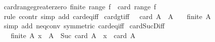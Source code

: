 \begin{isabellebody}
\isadelimproof
\isanewline
%
\endisadelimproof
\isanewline
{}\isamarkupfalse%
\ card{\isacharunderscore}{\kern0pt}range{\isacharunderscore}{\kern0pt}greater{\isacharunderscore}{\kern0pt}zero{\isacharcolon}{\kern0pt}\ {\isachardoublequoteopen}finite\ {\isacharparenleft}{\kern0pt}range\ f{\isacharparenright}{\kern0pt}\ {\isasymLongrightarrow}\ card\ {\isacharparenleft}{\kern0pt}range\ f{\isacharparenright}{\kern0pt}\ {\isachargreater}{\kern0pt}\ {}{\isachardoublequoteclose}\isanewline
%
\isadelimproof
\ \ %
\endisadelimproof
%
\isatagproof
{}\isamarkupfalse%
\ {\isacharparenleft}{\kern0pt}rule\ ccontr{\isacharparenright}{\kern0pt}\ {\isacharparenleft}{\kern0pt}simp\ add{\isacharcolon}{\kern0pt}\ card{\isacharunderscore}{\kern0pt}eq{\isacharunderscore}{\kern0pt}{}{\isacharunderscore}{\kern0pt}iff{\isacharparenright}{\kern0pt}%
\endisatagproof
{\isafoldproof}%
%
\isadelimproof
\isanewline
%
\endisadelimproof
\isanewline
{}\isamarkupfalse%
\ card{\isacharunderscore}{\kern0pt}gt{\isacharunderscore}{\kern0pt}{}{\isacharunderscore}{\kern0pt}iff{\isacharcolon}{\kern0pt}\ {\isachardoublequoteopen}{}\ {\isacharless}{\kern0pt}\ card\ A\ {\isasymlongleftrightarrow}\ A\ {\isasymnoteq}\ {\isacharbraceleft}{\kern0pt}{\isacharbraceright}{\kern0pt}\ {\isasymand}\ finite\ A{\isachardoublequoteclose}\isanewline
%
\isadelimproof
\ \ %
\endisadelimproof
%
\isatagproof
{}\isamarkupfalse%
\ {\isacharparenleft}{\kern0pt}simp\ add{\isacharcolon}{\kern0pt}\ neq{}{\isacharunderscore}{\kern0pt}conv\ {\isacharbrackleft}{\kern0pt}symmetric{\isacharbrackright}{\kern0pt}\ card{\isacharunderscore}{\kern0pt}eq{\isacharunderscore}{\kern0pt}{}{\isacharunderscore}{\kern0pt}iff{\isacharparenright}{\kern0pt}%
\endisatagproof
{\isafoldproof}%
%
\isadelimproof
\isanewline
%
\endisadelimproof
\isanewline
{}\isamarkupfalse%
\ card{\isacharunderscore}{\kern0pt}Suc{\isacharunderscore}{\kern0pt}Diff{}{\isacharcolon}{\kern0pt}\isanewline
\ \ \ {\isachardoublequoteopen}finite\ A{\isachardoublequoteclose}\ {\isachardoublequoteopen}x\ {\isasymin}\ A{\isachardoublequoteclose}\ \ {\isachardoublequoteopen}Suc\ {\isacharparenleft}{\kern0pt}card\ {\isacharparenleft}{\kern0pt}A\ {\isacharminus}{\kern0pt}\ {\isacharbraceleft}{\kern0pt}x{\isacharbraceright}{\kern0pt}{\isacharparenright}{\kern0pt}{\isacharparenright}{\kern0pt}\ {\isacharequal}{\kern0pt}\ card\ A{\isachardoublequoteclose}\isanewline
%
\isadelimproof
%
\endisadelimproof

\end{isabellebody}
